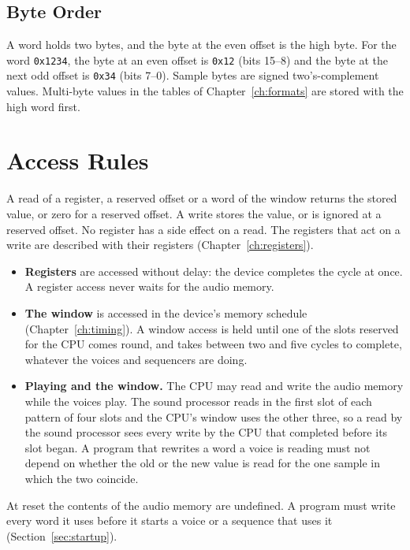 \subsection{Byte Order}
\label{sec:byte-order}

A word holds two bytes, and the byte at the even offset is the high byte. For the word \texttt{0x1234}, the byte at an
even offset is \texttt{0x12} (bits 15--8) and the byte at the next odd offset is \texttt{0x34} (bits 7--0). Sample
bytes are signed two's-complement values. Multi-byte values in the tables of Chapter~\ref{ch:formats} are stored with
the high word first.

\section{Access Rules}
\label{sec:access-rules}

A read of a register, a reserved offset or a word of the window returns the stored value, or zero for a reserved
offset. A write stores the value, or is ignored at a reserved offset. No register has a side effect on a read. The
registers that act on a write are described with their registers (Chapter~\ref{ch:registers}).

\begin{itemize}
	\item \textbf{Registers} are accessed without delay: the device completes the cycle at once. A register access never
	      waits for the audio memory.
	\item \textbf{The window} is accessed in the device's memory schedule (Chapter~\ref{ch:timing}). A window access
	      is held until one of the slots reserved for the CPU comes round, and takes between two and five cycles to
	      complete, whatever the voices and sequencers are doing.
	\item \textbf{Playing and the window.} The CPU may read and write the audio memory while the voices play. The sound
	      processor reads in the first slot of each pattern of four slots and the CPU's window uses the other three, so a
	      read by the sound processor sees every write by the CPU that completed before its slot began. A program that
	      rewrites a word a voice is reading must not depend on whether the old or the new value is read for the one sample
	      in which the two coincide.
\end{itemize}

At reset the contents of the audio memory are undefined. A program must write every word it uses before it starts a
voice or a sequence that uses it (Section~\ref{sec:startup}).

